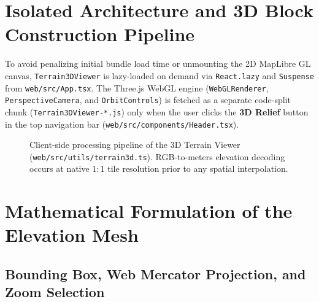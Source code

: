 \documentclass[11pt,a4paper]{article}
\newcommand{\src}[1]{\nolinkurl{#1}}
\begin{document}
\section{Isolated Architecture and 3D Block Construction Pipeline}
\label{sec:relieve3d-arquitectura}

To avoid penalizing initial bundle load time or unmounting the 2D MapLibre GL canvas, \texttt{Terrain3DViewer} is lazy-loaded on demand via \texttt{React.lazy} and \texttt{Suspense} from \src{web/src/App.tsx}. The Three.js WebGL engine (\texttt{WebGLRenderer}, \texttt{PerspectiveCamera}, and \texttt{OrbitControls}) is fetched as a separate code-split chunk (\texttt{Terrain3DViewer-*.js}) only when the user clicks the \textbf{3D Relief} button in the top navigation bar (\src{web/src/components/Header.tsx}).

\begin{figure}[htbp]
\centering
{}
\caption{Client-side processing pipeline of the 3D Terrain Viewer (\src{web/src/utils/terrain3d.ts}).
RGB-to-meters elevation decoding occurs at native $1:1$ tile resolution prior to any spatial interpolation.}
\label{fig:flujo-relieve3d}
\end{figure}

\section{Mathematical Formulation of the Elevation Mesh}
\label{sec:relieve3d-matematicas}

\subsection{Bounding Box, Web Mercator Projection, and Zoom Selection}
\label{sec:relieve3d-mercator}
\end{document}
